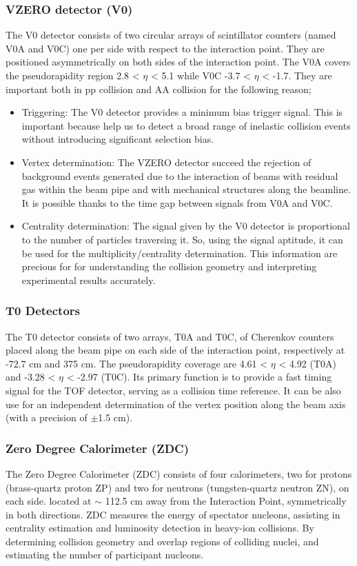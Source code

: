 \documentclass[12pt,a4paper]{book}
\begin{document}
	\subsubsection{VZERO detector (V0)} 
	The V0 detector consists of two circular arrays of scintillator counters (named V0A and V0C) one per side with respect to the interaction point. They are positioned asymmetrically on both sides of the interaction point. The V0A covers the pseudorapidity region 2.8 < $\eta$ < 5.1 while V0C -3.7 < $\eta$ < -1.7. They are important both in pp collision and AA collision for the following reason;
	\begin{itemize}
		\item Triggering: The V0 detector provides a minimum bias trigger signal. This is important because help us to detect a broad range of inelastic collision events without introducing significant selection bias.
		\item Vertex determination: The VZERO detector succeed the rejection of background events generated due to the interaction of beams with residual gas within
		the beam pipe and with mechanical structures along the beamline. It is possible thanks to the time gap between signals from V0A and V0C.
		\item Centrality determination: The signal given by the V0 detector is proportional to
		the number of particles traversing it. So, using the signal aptitude, it can be used for the multiplicity/centrality	determination. This information are precious for for understanding the collision geometry and interpreting experimental results accurately.
	\end{itemize}
	 \cite{Padhan:2924203} \cite{amsdottorato9036}	
	
	\subsubsection{T0 Detectors}
	The T0 detector consists of two arrays, T0A and T0C, of Cherenkov counters placed along the beam pipe on each side of the interaction point, respectively at -72.7 cm and 375 cm.  The pseudorapidity coverage are	4.61 < $\eta$ < 4.92 (T0A) and -3.28 < $\eta$ < -2.97 (T0C). Its primary function is to provide a fast timing signal for the TOF detector, serving as a collision time reference. It can be also use for an independent determination of the vertex position along the beam axis (with a precision of $\pm$1.5 cm). \cite{Padhan:2924203} \cite{amsdottorato9036}	
	
	\subsubsection{Zero Degree Calorimeter (ZDC)}
	The Zero Degree Calorimeter (ZDC) consists of four calorimeters, two for protons (brass-quartz proton ZP) and two for neutrons (tungsten-quartz neutron ZN), on each side. located at $\sim$ 112.5 cm away from the Interaction Point,	symmetrically in both directions. ZDC measures the energy of spectator nucleons, assisting in centrality estimation and luminosity detection in heavy-ion collisions. By determining
	collision geometry and overlap regions of colliding nuclei, and estimating the number of
	participant nucleons.\cite{Padhan:2924203} \cite{amsdottorato9036}	
	
\end{document}
